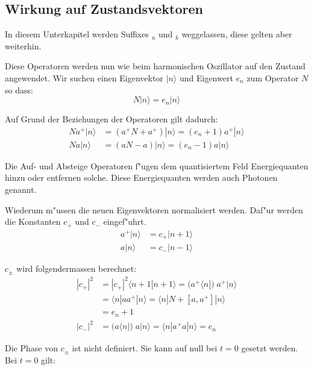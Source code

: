\subsection{Wirkung auf Zustandsvektoren}

In diesem Unterkapitel werden Suffixes $_n$ und $_k$ weggelassen, diese gelten aber weiterhin. 

Diese Operatoren werden nun wie beim harmonischen Oszillator auf den Zustand angewendet. Wir suchen einen Eigenvektor $|n\rangle$ und Eigenwert $e_n$ zum Operator $N$ so dass:
\begin{equation}
N|n\rangle = e_n|n\rangle
\end{equation}

Auf Grund der Beziehungen der Operatoren gilt dadurch:
\begin{equation}
\begin{split}
Na^+|n\rangle &= (a^+N + a^+)|n\rangle = (e_n + 1)a^+|n\rangle \\
Na|n\rangle &= (aN - a)|n\rangle = (e_n - 1)a|n\rangle
\end{split}
\end{equation}

Die Auf- und Absteige Operatoren f"ugen dem quantisiertem Feld Energiequanten hinzu oder entfernen solche. Diese Energiequanten werden auch Photonen genannt. 

Wiederum m"ussen die neuen Eigenvektoren normalisiert werden. Daf"ur werden die Konstanten $c_+$ und $c_-$ eingef"uhrt.
\begin{equation}
\begin{split}
a^+|n\rangle &= c_+|n+1\rangle \\
a|n\rangle &= c_-|n-1\rangle
\end{split}
\end{equation}

$c_\pm$ wird folgendermassen berechnet:
\begin{equation}
\begin{split}
	|c_+|^2 &= |c_+|^2 \langle n+1 | n+1 \rangle = ( a^+ \langle n |) \; a^+ | n \rangle \\
		&= \langle n | aa^+ |n \rangle = \langle n | N + [a,a^+] |n \rangle \\
		&= e_n+1 \\
	|c_-|^2 &= 	( a \langle n |) \; a | n \rangle = \langle n | a^+a | n \rangle = e_n
\end{split}
\end{equation}

Die Phase von $c_{\pm}$ ist nicht definiert. Sie kann auf null bei $t=0$ gesetzt werden. Bei $t=0$ gilt:

